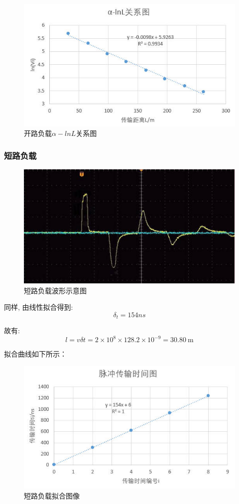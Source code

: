 \documentclass[UTF8]{ctexart}
\begin{document}
\begin{figure}[H]
  \centering
  \includegraphics[scale=0.4]{图表2.jpg}
  \caption{开路负载$\alpha-lnL$关系图}
  \label{fig:my_label}
\end{figure}

\subsubsection{短路负载}
\begin{figure}[H]
  \centering
  \includegraphics[scale=0.45]{2.jpg}
  \caption{短路负载波形示意图}
  \label{fig:my_label}
\end{figure}

同样, 由线性拟合得到:
$$
\delta_t=154 n s
$$

故有:
$$
l=v \delta t=2 \times 10^{8} \times 128.2 \times 10^{-9}=30.80 \mathrm{~m}
$$

拟合曲线如下所示：


\begin{figure}[H]
  \centering
  \includegraphics[scale=0.4]{图表3.jpg}
  \caption{短路负载拟合图像}
  \label{fig:my_label}
\end{figure}
\end{document}
